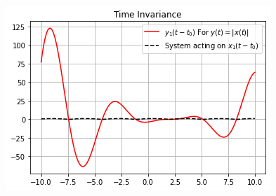 \documentclass[journal,12pt,twocolumn]{IEEEtran}
\begin{document}
\begin{figure}[h]
\includegraphics[width = \columnwidth]{y3_t}
\end{figure}
\end{document}

